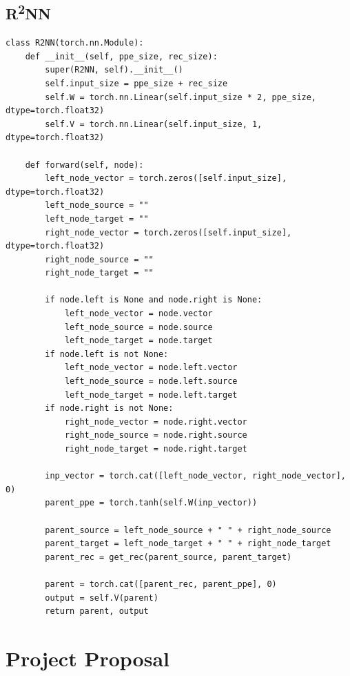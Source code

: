 \documentclass[12pt,a4paper,twoside,openright]{report}
\begin{document}
\section{\texorpdfstring{R\textsuperscript{2}NN}{R2NN}}
\begin{lstlisting}
class R2NN(torch.nn.Module):
    def __init__(self, ppe_size, rec_size):
        super(R2NN, self).__init__()
        self.input_size = ppe_size + rec_size
        self.W = torch.nn.Linear(self.input_size * 2, ppe_size, dtype=torch.float32)
        self.V = torch.nn.Linear(self.input_size, 1, dtype=torch.float32)

    def forward(self, node):
        left_node_vector = torch.zeros([self.input_size], dtype=torch.float32)
        left_node_source = ""
        left_node_target = ""
        right_node_vector = torch.zeros([self.input_size], dtype=torch.float32)
        right_node_source = ""
        right_node_target = ""

        if node.left is None and node.right is None:
            left_node_vector = node.vector
            left_node_source = node.source
            left_node_target = node.target
        if node.left is not None:
            left_node_vector = node.left.vector
            left_node_source = node.left.source
            left_node_target = node.left.target
        if node.right is not None:
            right_node_vector = node.right.vector
            right_node_source = node.right.source
            right_node_target = node.right.target

        inp_vector = torch.cat([left_node_vector, right_node_vector], 0)
        parent_ppe = torch.tanh(self.W(inp_vector))

        parent_source = left_node_source + " " + right_node_source
        parent_target = left_node_target + " " + right_node_target
        parent_rec = get_rec(parent_source, parent_target)

        parent = torch.cat([parent_rec, parent_ppe], 0)
        output = self.V(parent)
        return parent, output
\end{lstlisting}


\chapter{Project Proposal}

\end{document}
